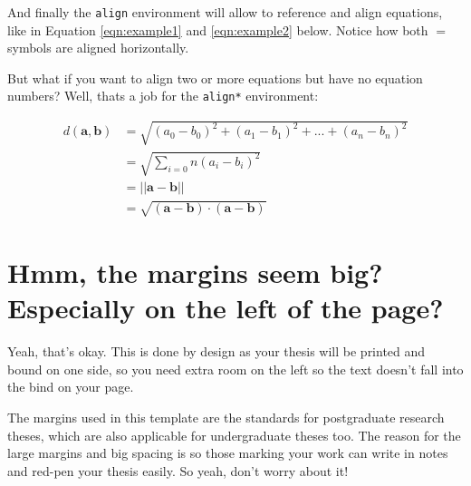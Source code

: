 And finally the \texttt{align} environment will allow to reference and align equations, like in Equation \ref{eqn:example1} and \ref{eqn:example2} below. Notice how both $=$ symbols are aligned horizontally.


But what if you want to align two or more equations but have no equation numbers? Well, thats a job for the \texttt{align*} environment:

\begin{framed}
\begin{align*}
d(\mathbf{a}, \mathbf{b}) &= \sqrt{(a_0 - b_0)^2 + (a_1 - b_1)^2 + ... + (a_n - b_n)^2} \\
        &= \sqrt{\sum_{i=0}{n}{(a_i - b_i)^2}} \\
        &= || \mathbf{a} - \mathbf{b} || \\
        &= \sqrt{(\mathbf{a} - \mathbf{b}) \cdot (\mathbf{a} - \mathbf{b})}
\end{align*}
\end{framed}


\section{Hmm, the margins seem big? Especially on the left of the page?}
Yeah, that's okay. This is done by design as your thesis will be printed and bound on one side, so you need extra room on the left so the text doesn't fall into the bind on your page.

The margins used in this template are the standards for postgraduate research theses, which are also applicable for undergraduate theses too. The reason for the large margins and big spacing is so those marking your work can write in notes and red-pen your thesis easily. So yeah, don't worry about it!

\cleardoublepage